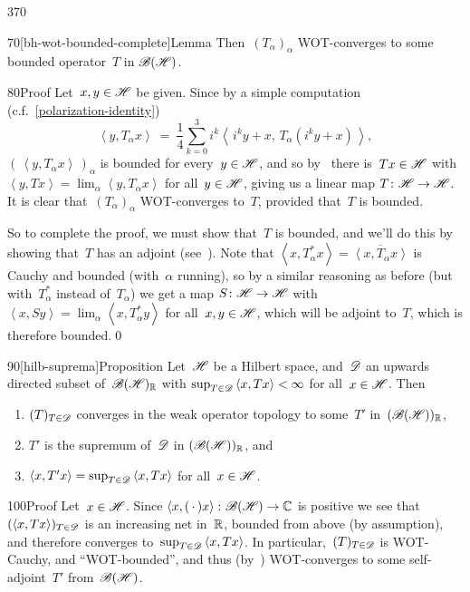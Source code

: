 \begin{parsec}{370}
\begin{point}{70}[bh-wot-bounded-complete]{Lemma}
Then~$(T_\alpha)_\alpha$
WOT-converges to some bounded operator~$T$ in $\mathscr{B}(\mathscr{H})$.
\begin{point}{80}{Proof}%
Let~$x,y\in \mathscr{H}$ be given.
Since by a simple computation
(c.f.~\eqref{polarization-identity})
\begin{equation*}
	\textstyle
	\left<y,T_\alpha x\right>
	\ = \ \frac{1}{4}\sum_{k=0}^3
	i^k\left<\,i^ky+x,\,T_\alpha (i^ky+x)\,\right>,
\end{equation*}
 $(\,\left<y,T_\alpha x\right>\,)_\alpha$
is bounded for every~$y\in \mathscr{H}$,
and so by~ there is~$Tx\in \mathscr{H}$ 
with $\left<y,Tx\right>=\lim_\alpha \left<y,T_\alpha x\right>$
for all~$y\in\mathscr{H}$,
giving us a linear map $T\colon \mathscr{H}\to \mathscr{H}$.
It is clear that~$(T_\alpha)_\alpha$
WOT-converges to~$T$,
provided that~$T$ is bounded.

So to complete the proof,
we must show that~$T$ is bounded,
and we'll do this by showing that~$T$ has an adjoint
(see~).
Note that $\left<x,T_\alpha^* x\right>=\overline{\left<x,T_\alpha x\right>}$
is Cauchy and bounded (with~$\alpha$ running),
so by a similar reasoning as before (but with~$T^*_\alpha$
instead of~$T_\alpha$)
we get a map
$S\colon \mathscr{H}\to\mathscr{H}$
with $\left<x,Sy\right>=\lim_\alpha \left<x,T^*_\alpha y\right>$
for all~$x,y\in\mathscr{H}$, which will be adjoint to~$T$,
which is therefore bounded.\qed
\end{point}
\end{point}
\begin{point}{90}[hilb-suprema]{Proposition}%
Let~$\mathscr{H}$ be a Hilbert space,
and~$\mathscr{D}$ an upwards directed subset of~$\mathscr{B}(\mathscr{H})_{\mathbb{R}}$
with $\sup_{T\in \mathscr{D}} \left<x,Tx\right> <\infty$
for all~$x\in \mathscr{H}$. Then
\begin{enumerate}
\item
$(T)_{T\in\mathscr{D}}$
converges 
in the weak operator topology
to some~$T'$ in~$(\mathscr{B}(\mathscr{H}))_{\mathbb{R}}$,
\item
$T'$ is the supremum of~$\mathscr{D}$
in $(\mathscr{B}(\mathscr{H}))_{\mathbb{R}}$,
and 
\item
$\left<x,T'x\right> = 
\sup_{T\in\mathscr{D}}\left<x,Tx\right> $
for all~$x\in \mathscr{H}$.
\end{enumerate}
\spacingfix
\begin{point}{100}{Proof}%
Let~$x\in \mathscr{H}$.
Since $\left<x,(\,\cdot\,)x\right>\colon \mathscr{B}(\mathscr{H})\to \mathbb{C}$
is positive
we see that
$(\left<x,Tx\right>)_{T\in\mathscr{D}}$
is an increasing net in~$\mathbb{R}$, 
bounded from above (by assumption),
and therefore converges to~$\sup_{T\in\mathscr{D}}\left<x,Tx\right>$.
In particular,~$(T)_{T\in\mathscr{D}}$
is WOT-Cauchy,
and ``WOT-bounded'',
and thus
(by~)
WOT-converges to some self-adjoint~$T'$ from~$\mathscr{B}(\mathscr{H})$.


\end{point}
\end{point}
\end{parsec}
